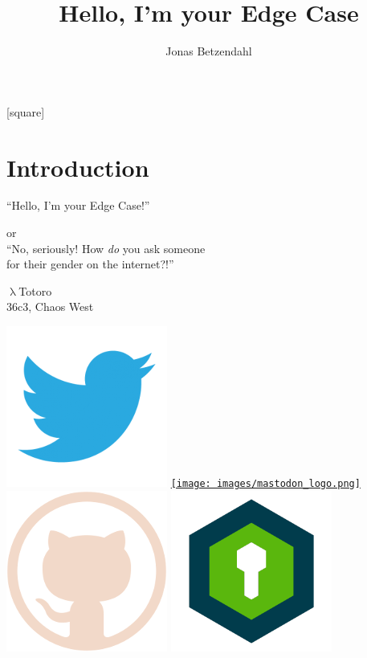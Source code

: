 \documentclass[aspectratio=169,x11names]{beamer}
\author{Jonas Betzendahl}
\title{Hello, I'm your Edge Case}
\begin{document}
[square]



\section{Introduction}

\begin{frame}
\begin{center}
\vfill
\huge ``Hello, I'm your Edge Case!''
\normalsize 
\smallskip
\smallskip

or\\
``No, seriously! How \emph{do} you ask someone\\ for their gender on the internet?!''

\bigskip\bigskip

\large $\uplambda$Totoro\\
36c3, Chaos West
\bigskip\bigskip

\href{https://twitter.com/lambdatotoro}{\includegraphics[scale=0.125]{images/twitter_logo.png}}
\href{https://chaos.social/@lambdatotoro}{\texttt{[image: images/mastodon\_logo.png]}}
\href{https://github.com/lambdaTotoro}{\includegraphics[scale=0.125]{images/github_logo.png}}
\href{https://whispeer.de/en/user/jbetzend}{\includegraphics[scale=0.125]{images/whispeer_logo.png}}


\end{center}
\end{frame}
\end{document}
